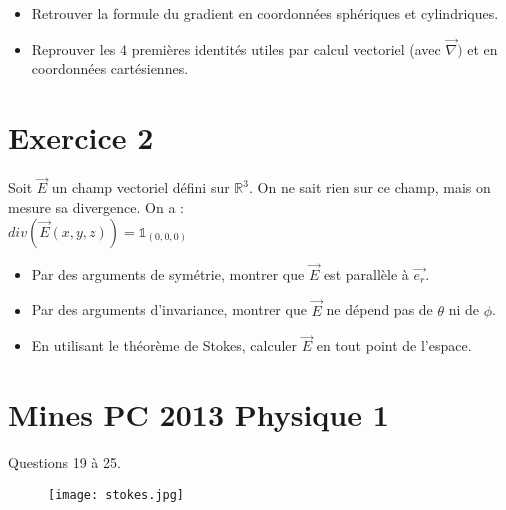 \documentclass{article}
\begin{document}
\begin{itemize}
  \item Retrouver la formule du gradient en coordonnées sphériques et cylindriques.
  \item Reprouver les 4 premières identités utiles par calcul vectoriel (avec $\vec{\nabla})$ et en coordonnées cartésiennes.
\end{itemize}

\section{Exercice 2}

Soit $\vec{E}$ un champ vectoriel défini sur $\mathbb{R}^3$. On ne sait rien sur ce champ, mais on mesure sa divergence. On a : \\

$ div(\vec{E}(x, y, z)) = \mathbb{1}_{(0,0,0)}$ \\
\begin{itemize}
  \item Par des arguments de symétrie, montrer que $\vec{E}$ est parallèle à $\vec{e_r}$.
  \item Par des arguments d'invariance, montrer que $\vec{E}$ ne dépend pas de $\theta$ ni de $\phi$.
  \item En utilisant le théorème de Stokes, calculer $\vec{E}$ en tout point de l'espace.
\end{itemize}



\section{Mines PC 2013 Physique 1}
Questions 19 à 25. \\[3cm]


\begin{figure}[h!]
  \centering
  \texttt{[image: stokes.jpg]}
\end{figure}
\end{document}
